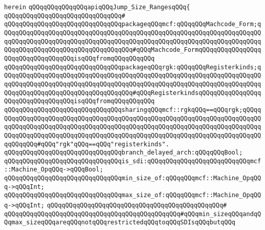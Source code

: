 \verb|herein|\newline
\newline
\verb|qQQqqQQqqQQqqQQqapiqQQqJump_Size_RangesqQQq{|\newline
\verb|qQQqqQQqqQQqqQQqqQQqqQQqqQQqqQQq#|\newline
\verb|qQQqqQQqqQQqqQQqqQQqqQQqqQQqqQQqpackageqQQqmcf:qQQqqQQqMachcode_Form;qQQqqQQqqQQqqQQqqQQqqQQqqQQqqQQqqQQqqQQqqQQqqQQqqQQqqQQqqQQqqQQqqQQqqQQqqQQqqQQqqQQqqQQqqQQqqQQqqQQqqQQqqQQqqQQqqQQqqQQqqQQqqQQqqQQqqQQqqQQqqQQqqQQqqQQqqQQqqQQqqQQqqQQqqQQqqQQq#qQQqMachcode_FormqQQqqQQqqQQqqQQqqQQqqQQqqQQqqQQqqQQqisqQQqfromqQQqqQQqqQQq|\newline
\verb|qQQqqQQqqQQqqQQqqQQqqQQqqQQqqQQqpackageqQQqrgk:qQQqqQQqRegisterkinds;qQQqqQQqqQQqqQQqqQQqqQQqqQQqqQQqqQQqqQQqqQQqqQQqqQQqqQQqqQQqqQQqqQQqqQQqqQQqqQQqqQQqqQQqqQQqqQQqqQQqqQQqqQQqqQQqqQQqqQQqqQQqqQQqqQQqqQQqqQQqqQQqqQQqqQQqqQQqqQQqqQQqqQQqqQQqqQQq#qQQqRegisterkindsqQQqqQQqqQQqqQQqqQQqqQQqqQQqqQQqqQQqisqQQqfromqQQqqQQqqQQq|\newline
\newline
\verb|qQQqqQQqqQQqqQQqqQQqqQQqqQQqqQQqsharingqQQqmcf::rgkqQQq==qQQqrgk;qQQqqQQqqQQqqQQqqQQqqQQqqQQqqQQqqQQqqQQqqQQqqQQqqQQqqQQqqQQqqQQqqQQqqQQqqQQqqQQqqQQqqQQqqQQqqQQqqQQqqQQqqQQqqQQqqQQqqQQqqQQqqQQqqQQqqQQqqQQqqQQqqQQqqQQqqQQqqQQqqQQqqQQqqQQqqQQqqQQqqQQqqQQqqQQqqQQqqQQqqQQqqQQqqQQqqQQqqQQqqQQq#qQQq"rgk"qQQq==qQQq"registerkinds".|\newline
\newline
\verb|qQQqqQQqqQQqqQQqqQQqqQQqqQQqqQQqbranch_delayed_arch:qQQqqQQqBool;|\newline
\newline
\verb|qQQqqQQqqQQqqQQqqQQqqQQqqQQqqQQqis_sdi:qQQqqQQqqQQqqQQqqQQqqQQqqQQqmcf::Machine_OpqQQq->qQQqBool;|\newline
\verb|qQQqqQQqqQQqqQQqqQQqqQQqqQQqqQQqmin_size_of:qQQqqQQqmcf::Machine_OpqQQq->qQQqInt;|\newline
\verb|qQQqqQQqqQQqqQQqqQQqqQQqqQQqqQQqmax_size_of:qQQqqQQqmcf::Machine_OpqQQq->qQQqInt;|\newline
\verb|qQQqqQQqqQQqqQQqqQQqqQQqqQQqqQQqqQQqqQQqqQQqqQQq#|\newline
\verb|qQQqqQQqqQQqqQQqqQQqqQQqqQQqqQQqqQQqqQQqqQQqqQQq#qQQqmin_sizeqQQqandqQQqmax_sizeqQQqareqQQqnotqQQqrestrictedqQQqtoqQQqSDIsqQQqbutqQQq|\newline
